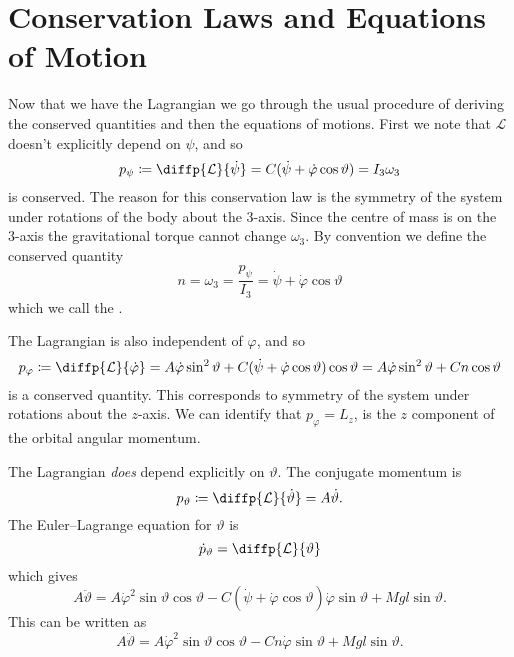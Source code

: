 \documentclass[fleqn]{NotesClass}
\newcommand*{\lagrangian}{\mathcal{L}}
\begin{document}
    \section{Conservation Laws and Equations of Motion}
    Now that we have the Lagrangian we go through the usual procedure of deriving the conserved quantities and then the equations of motions.
    First we note that \(\lagrangian\) doesn't explicitly depend on \(\psi\), and so
    \begin{equation}
        p_\psi \coloneqq \diffp{\lagrangian}{\dot{\psi}} = C(\dot{\psi} + \dot{\varphi}\cos\vartheta) = I_3\omega_3
    \end{equation}
    is conserved.
    The reason for this conservation law is the symmetry of the system under rotations of the body about the 3-axis.
    Since the centre of mass is on the 3-axis the gravitational torque cannot change \(\omega_3\).
    By convention we define the conserved quantity
    \begin{equation}
        n = \omega_3 = \frac{p_\psi}{I_3} = \dot{\psi} + \dot{\varphi} \cos\vartheta
    \end{equation}
    which we call the .
    
    The Lagrangian is also independent of \(\varphi\), and so
    \begin{equation}
        p_{\varphi} \coloneqq \diffp{\lagrangian}{\dot{\varphi}} = A\dot{\varphi}\sin^2\vartheta + C(\dot{\psi} + \dot{\varphi}\cos\vartheta)\cos\vartheta = A\dot{\varphi}\sin^2\vartheta + Cn\cos\vartheta
    \end{equation}
    is a conserved quantity.
    This corresponds to symmetry of the system under rotations about the \(z\)-axis.
    We can identify that \(p_\varphi = L_z\), is the \(z\) component of the orbital angular momentum.
    
    The Lagrangian \emph{does} depend explicitly on \(\vartheta\).
    The conjugate momentum is
    \begin{equation}
        p_{\vartheta} \coloneqq \diffp{\lagrangian}{\dot{\vartheta}} = A\dot{\vartheta}.
    \end{equation}
    The Euler--Lagrange equation for \(\vartheta\) is
    \begin{equation}
        \dot{p}_{\vartheta} = \diffp{\lagrangian}{\vartheta}
    \end{equation}
    which gives
    \begin{equation}
        A\ddot{\vartheta} = A\dot{\varphi}^2\sin\vartheta\cos\vartheta - C(\dot{\psi} + \dot{\varphi}\cos\vartheta)\dot{\varphi}\sin\vartheta + Mgl\sin\vartheta.
    \end{equation}
    This can be written as
    \begin{equation}
        A\ddot{\vartheta} = A\dot{\varphi}^2\sin\vartheta\cos\vartheta - Cn\dot{\varphi}\sin\vartheta + Mgl\sin\vartheta.
    \end{equation}
    
\end{document}
